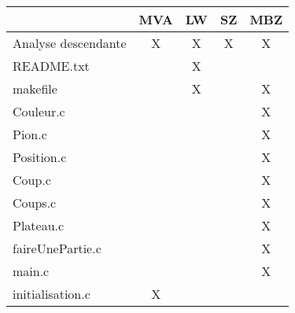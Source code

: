 \begin{table}[h]
\centering
\begin{tabular}{l|c|c|c|c|}

\cline{2-5}
                                                        & MVA & LW & SZ & MBZ \\ \hline
\multicolumn{1}{|l|}{Analyse descendante}               & X                     & X              & X                     & X                      \\ \hline
\multicolumn{1}{|l|}{README.txt}                        & \multicolumn{1}{l|}{} & X              & \multicolumn{1}{l|}{} & \multicolumn{1}{l|}{}  \\ \hline
\multicolumn{1}{|l|}{makefile}                          &                       & X               &                       & X                      \\ \hline
\multicolumn{1}{|l|}{Couleur.c}                         &                       &                &                       & X                      \\ \hline
\multicolumn{1}{|l|}{Pion.c}                            &                       &                &                       & X                      \\ \hline
\multicolumn{1}{|l|}{Position.c}                        &                       &                &                       & X                      \\ \hline
\multicolumn{1}{|l|}{Coup.c}                            &                       &                &                       & X                      \\ \hline
\multicolumn{1}{|l|}{Coups.c}                           &                       &                &                       & X                      \\ \hline
\multicolumn{1}{|l|}{Plateau.c}                         &                       &                &                       & X                      \\ \hline
\multicolumn{1}{|l|}{faireUnePartie.c}                  &                       &                &                       & X                       \\ \hline
\multicolumn{1}{|l|}{main.c}                  &                       &                &                       & X                       \\ \hline
\multicolumn{1}{|l|}{initialisation.c}                  & X                     &                &                       &                        \\ \hline

\end{tabular}
\end{table}
